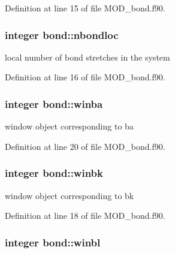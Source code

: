 Definition at line 15 of file M\-O\-D\-\_\-bond.\-f90.

\hypertarget{classbond_a0f5ecb5dd524ee50c5ec342848406013}{
\subsubsection[{nbondloc}]{\setlength{\rightskip}{0pt plus 5cm}integer bond\-::nbondloc}}\label{classbond_a0f5ecb5dd524ee50c5ec342848406013}


local number of bond stretches in the system 



Definition at line 16 of file M\-O\-D\-\_\-bond.\-f90.

\hypertarget{classbond_ad745f5076fde83250c415387f3d01ff8}{
\subsubsection[{winba}]{\setlength{\rightskip}{0pt plus 5cm}integer bond\-::winba}}\label{classbond_ad745f5076fde83250c415387f3d01ff8}


window object corresponding to ba 



Definition at line 20 of file M\-O\-D\-\_\-bond.\-f90.

\hypertarget{classbond_ab7e99ca415e49076ed9366c543f23631}{
\subsubsection[{winbk}]{\setlength{\rightskip}{0pt plus 5cm}integer bond\-::winbk}}\label{classbond_ab7e99ca415e49076ed9366c543f23631}


window object corresponding to bk 



Definition at line 18 of file M\-O\-D\-\_\-bond.\-f90.

\hypertarget{classbond_a8481829f284ff0a55f6034079489be5e}{
\subsubsection[{winbl}]{\setlength{\rightskip}{0pt plus 5cm}integer bond\-::winbl}}\label{classbond_a8481829f284ff0a55f6034079489be5e}


